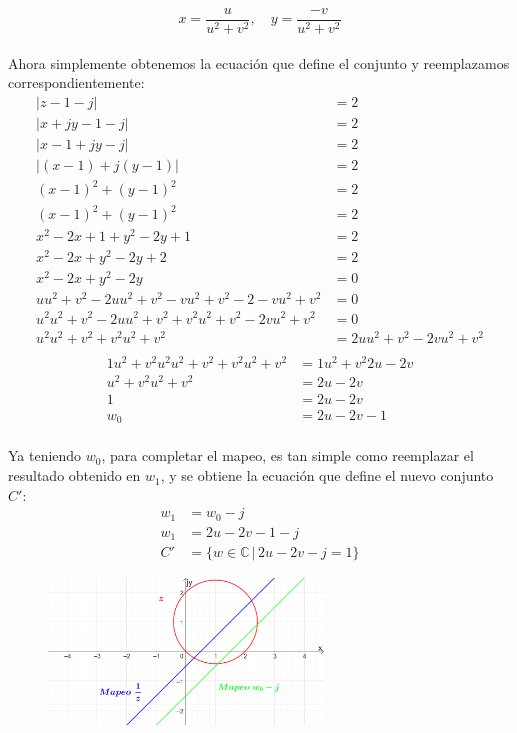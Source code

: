 \documentclass[12pt]{report}
\begin{document}
$$ x = \frac{u}{u^2 + v^2}, \quad y = \frac{-v}{u^2 + v^2} $$\\[6pt]
Ahora simplemente obtenemos la ecuación que define el conjunto y reemplazamos correspondientemente:\\
\begin{align*}
|z-1-j| &= 2 \\[6pt]
|x+jy-1-j| &= 2 \\[6pt]
|x-1+jy-j| &= 2 \\[6pt]
|(x-1)+j(y-1)| &= 2 \\[6pt]
(x-1)^2 + (y-1)^2 &= 2 \\[6pt]
(x-1)^2 + (y-1)^2 &= 2 \\[6pt]
x^2 - 2x + 1 + y^2 - 2y + 1 &= 2 \\[6pt]
x^2 - 2x + y^2 - 2y + 2 &= 2 \\[6pt]
x^2 - 2x + y^2 - 2y &= 0 \\[6pt]
uu^2 + v^2 - 2uu^2 + v^2 - vu^2 + v^2 - 2 - vu^2 + v^2 &= 0 \\[6pt]
u^2 u^2 + v^2 - 2uu^2 + v^2 + v^2 u^2 + v^2 - 2vu^2 + v^2 &= 0 \\[6pt]
u^2 u^2 + v^2 + v^2 u^2 + v^2 &= 2uu^2 + v^2 - 2vu^2 + v^2 \\[6pt]
\end{align*}
\begin{align*}
1 u^2 + v^2 u^2 u^2 + v^2 + v^2 u^2 + v^2 &= 1 u^2 + v^2 2u - 2v \\[6pt]
u^2 + v^2 u^2 + v^2 &= 2u - 2v \\[6pt]
1 &= 2u - 2v \\[6pt]
w_0 &= 2u - 2v - 1\\[6pt]
\end{align*}

Ya teniendo $w_0$, para completar el mapeo, es tan simple como reemplazar el resultado obtenido en $w_1$, y se obtiene la ecuación que define el nuevo conjunto \( C' \):\\


\begin{align*}
    w_1 &= w_0-j \\[5pt]
    w_1 &= 2u-2v-1-j \\[5pt]
    C' &= \{w \in \mathbb{C} \, | \, 2u-2v-j=1\}
\end{align*}


\begin{figure}[htbp] %
    \centering %
    \includegraphics[width=0.65\textwidth]{./Imagenes/foto2Ej3.png} %
\end{figure}
\end{document}
